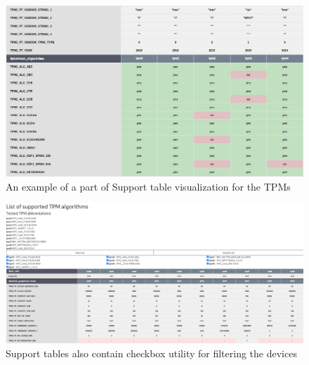 \begin{landscape}
    \begin{figure}[!t]
        \includegraphics[width=\linewidth, height=\textwidth]{img/visualizations/tpm-support-data.png}
        \caption{An example of a part of Support table visualization for the TPMs}
    \end{figure}
\end{landscape}

\begin{landscape}
    \begin{figure}[!t]
        \includegraphics[width=\linewidth, height=\textwidth]{img/visualizations/tpm-support-utility.png}
        \caption{Support tables also contain checkbox utility for filtering the devices}
    \end{figure}
\end{landscape}

